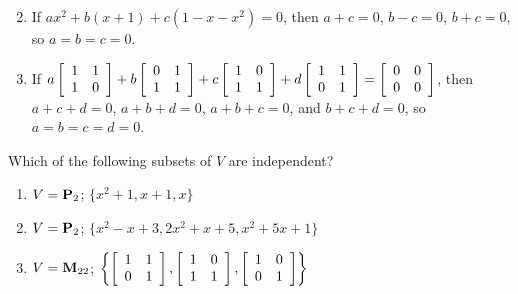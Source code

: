 \begin{multicols}{2}
\begin{ex}
\begin{enumerate}[label={\alph*.}]
\end{enumerate}
\begin{sol}
\begin{enumerate}[label={\alph*.}]
\setcounter{enumi}{1}
\item  If $ax^{2} + b(x + 1) + c(1 - x - x^{2}) = 0$, then $a + c = 0$, $b - c = 0$, $b + c = 0$, so $a = b = c = 0$.

\setcounter{enumi}{3}
\item  If $a
\left[ \begin{array}{rr}
1 & 1 \\
1 & 0
\end{array} \right]
+ b
\left[ \begin{array}{rr}
0 & 1 \\
1 & 1
\end{array} \right]
+ c
\left[ \begin{array}{rr}
1 & 0 \\
1 & 1
\end{array} \right]
+ d
\left[ \begin{array}{rr}
1 & 1 \\
0 & 1
\end{array} \right]
= 
\left[ \begin{array}{rr}
0 & 0 \\
0 & 0
\end{array} \right]$, then $a + c + d = 0$, $a + b + d = 0$, $a + b + c = 0$, and $b + c + d = 0$, so $a = b = c = d = 0$.

\end{enumerate}
\end{sol}
\end{ex}

\begin{ex}
Which of the following subsets of $V$ are independent?

\begin{enumerate}[label={\alph*.}]
\item $V = \textbf{P}_{2}$; $\{x^{2} + 1, x + 1, x\}$

\item $V = \textbf{P}_{2}$; $\{x^{2} - x + 3, 2x^{2} + x + 5, x^{2} + 5x + 1\}$

\item $V = \textbf{M}_{22}$;
$\left\{
\left[ \begin{array}{rr}
1 & 1 \\
0 & 1
\end{array} \right]
, 
\left[ \begin{array}{rr}
1 & 0 \\
1 & 1
\end{array} \right]
, 
\left[ \begin{array}{rr}
1 & 0 \\
0 & 1
\end{array} \right]
\right\}$


\end{enumerate}
\end{ex}
\end{multicols}
